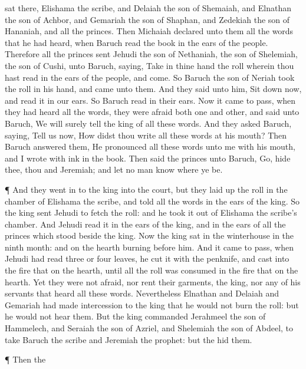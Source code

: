 {sat there,
{}
Elishama the
scribe, and
Delaiah the
son of
Shemaiah, and
Elnathan the
son of
Achbor, and
Gemariah the
son of
Shaphan, and
Zedekiah the
son of
Hananiah, and all the
princes.
Then
Michaiah
declared unto them all the
words that he had
heard, when
Baruch
read the
book in the
ears of the
people.
Therefore all the
princes
sent
Jehudi the
son of
Nethaniah, the
son of
Shelemiah, the
son of
Cushi, unto
Baruch,
saying,
Take in thine
hand the
roll wherein thou hast
read in the
ears of the
people, and
come. So
Baruch the
son of
Neriah
took the
roll in his
hand, and
came unto them.
And they
said unto him, Sit
down now, and
read it in our
ears. So
Baruch
read
{} in their
ears.
Now it came to pass, when they had
heard all the
words, they were
afraid
both
one and
other, and
said unto
Baruch, We will
surely
tell the
king of all these
words.
And they
asked
Baruch,
saying,
Tell us now, How didst thou
write all these
words at his
mouth?
Then
Baruch
answered them, He
pronounced all these
words unto me with his
mouth, and I
wrote
{} with
ink in the
book.
Then
said the
princes unto
Baruch,
Go,
hide thee, thou and
Jeremiah; and let no
man
know
where ye be.
\par }{\PP {}¶ And they went
in to the
king into the
court, but they laid
up the
roll in the
chamber of
Elishama the
scribe, and
told all the
words in the
ears of the
king.
So the
king
sent
Jehudi to
fetch the
roll: and he
took it out of
Elishama the
scribe’s
chamber. And
Jehudi
read it in the
ears of the
king, and in the
ears of all the
princes which
stood
beside the
king.
Now the
king
sat in the
winterhouse in the
ninth
month: and
{} on the
hearth
burning
before him.
And it came to pass,
{} when
Jehudi had
read
three or
four
leaves, he
cut it with the
penknife, and
cast
{} into the
fire that
{} on the
hearth, until all the
roll was
consumed in the
fire that
{} on the
hearth.
Yet they were not
afraid, nor
rent their
garments,
{} the
king, nor any of his
servants that
heard all these
words.
Nevertheless
Elnathan and
Delaiah and
Gemariah had made
intercession to the
king that he would not
burn the
roll: but he would not
hear them.
But the
king
commanded
Jerahmeel the
son of
Hammelech, and
Seraiah the
son of
Azriel, and
Shelemiah the
son of
Abdeel, to
take
Baruch the
scribe and
Jeremiah the
prophet: but the
{}
hid them.
\par }{\PP {}¶ Then the
}
